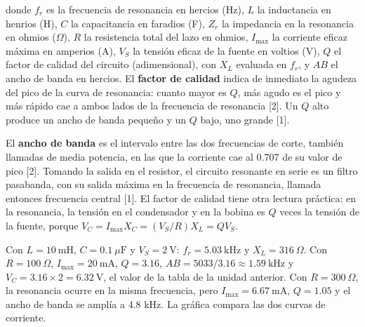 \documentclass[11pt,letterpaper]{article}
\begin{document}
donde $f_r$ es la frecuencia de resonancia en hercios (Hz), $L$ la inductancia en henrios (H), $C$ la capacitancia en faradios (F), $Z_r$ la impedancia en la resonancia en ohmios (\ensuremath{\Omega}), $R$ la resistencia total del lazo en ohmios, $I_{\mathrm{max}}$ la corriente eficaz máxima en amperios (A), $V_S$ la tensión eficaz de la fuente en voltios (V), $Q$ el factor de calidad del circuito (adimensional), con $X_L$ evaluada en $f_r$, y $AB$ el ancho de banda en hercios. El \textbf{factor de calidad} indica de inmediato la agudeza del pico de la curva de resonancia: cuanto mayor es $Q$, más agudo es el pico y más rápido cae a ambos lados de la frecuencia de resonancia [2]. Un $Q$ alto produce un ancho de banda pequeño y un $Q$ bajo, uno grande [1].

El \textbf{ancho de banda} es el intervalo entre las dos frecuencias de corte, también llamadas de media potencia, en las que la corriente cae al 0.707 de su valor de pico [2]. Tomando la salida en el resistor, el circuito resonante en serie es un filtro pasabanda, con su salida máxima en la frecuencia de resonancia, llamada entonces frecuencia central [1]. El factor de calidad tiene otra lectura práctica: en la resonancia, la tensión en el condensador y en la bobina es $Q$ veces la tensión de la fuente, porque $V_C = I_{\mathrm{max}} X_C = (V_S/R) X_L = Q V_S$.

Con $L = 10\ \text{mH}$, $C = 0.1\ \mu\text{F}$ y $V_S = 2\ \text{V}$: $f_r = 5.03\ \text{kHz}$ y $X_L = 316\ \Omega$. Con $R = 100\ \Omega$, $I_{\mathrm{max}} = 20\ \text{mA}$, $Q = 3.16$, $AB = 5033/3.16 \approx 1.59\ \text{kHz}$ y $V_C = 3.16 \times 2 = 6.32\ \text{V}$, el valor de la tabla de la unidad anterior. Con $R = 300\ \Omega$, la resonancia ocurre en la misma frecuencia, pero $I_{\mathrm{max}} = 6.67\ \text{mA}$, $Q = 1.05$ y el ancho de banda se amplía a 4.8 kHz. La gráfica compara las dos curvas de corriente.
\end{document}
